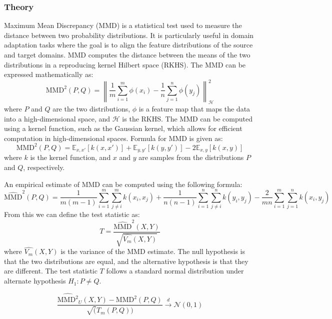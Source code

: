 \documentclass{article}
\begin{document}
\subsubsection*{Theory}
Maximum Mean Discrepancy (MMD) is a statistical test used to measure the distance between two probability distributions. It is particularly useful in domain adaptation tasks where the goal is to align the feature distributions of the source and target domains. MMD computes the distance between the means of the two distributions in a reproducing kernel Hilbert space (RKHS). The MMD can be expressed mathematically as:
\[
  \text{MMD}^2(P, Q) = \left\| \frac{1}{m} \sum_{i=1}^{m} \phi(x_i) - \frac{1}{n} \sum_{j=1}^{n} \phi(y_j) \right\|^2_{\mathcal{H}}
\]
where \(P\) and \(Q\) are the two distributions, \(\phi\) is a feature map that maps the data into a high-dimensional space, and \(\mathcal{H}\) is the RKHS. The MMD can be computed using a kernel function, such as the Gaussian kernel, which allows for efficient computation in high-dimensional spaces. 
Formula for MMD is given as:
\[
  \text{MMD}^2(P, Q) = \mathbb{E}_{x,x'}[k(x,x')] + \mathbb{E}_{y,y'}[k(y,y')] - 2\mathbb{E}_{x,y}[k(x,y)]
\]
where \(k\) is the kernel function, and \(x\) and \(y\) are samples from the distributions \(P\) and \(Q\), respectively. 

An empirical estimate of MMD can be computed using the following formula:
\[
  \widehat{\text{MMD}}^2(P, Q) = \frac{1}{m(m-1)} \sum_{i=1}^{m} \sum_{j \neq i}^{m} k(x_i, x_j) + \frac{1}{n(n-1)} \sum_{i=1}^{n} \sum_{j \neq i}^{n} k(y_i, y_j) - \frac{2}{mn} \sum_{i=1}^{m} \sum_{j=1}^{n} k(x_i, y_j)
\]
From this we can define the test statistic as:
\[
  T = \frac{\widehat{\text{MMD}}^2(X,Y)}{\sqrt{\hat{V_m}(X,Y)}}
\]
where \(\widehat{V_m}(X,Y)\) is the variance of the MMD estimate. The null hypothesis is that the two distributions are equal, and the alternative hypothesis is that they are different. The test statistic \(T\) follows a standard normal distribution under alternate hypothesis \(H_1: P \neq Q\).

\[
  \frac{\widehat{\text{MMD}^2}_U(X,Y) - \text{MMD}^2(P,Q)}{\sqrt(T_m(P,Q))} \xrightarrow{d} \mathcal{N}(0,1)
\]
\end{document}
